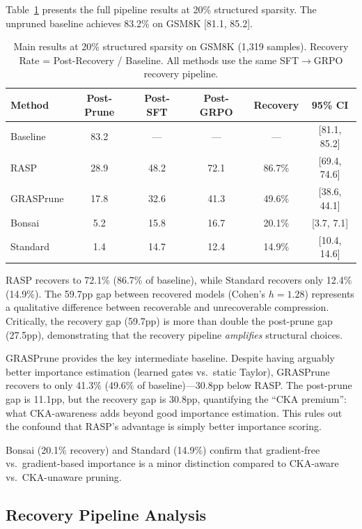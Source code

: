 \documentclass[11pt]{article}
\begin{document}
Table~\ref{tab:main} presents the full pipeline results at 20\% structured sparsity.
The unpruned baseline achieves 83.2\% on GSM8K [81.1, 85.2].

\begin{table}[t]
\centering
\caption{Main results at 20\% structured sparsity on GSM8K (1{,}319 samples). Recovery Rate = Post-Recovery / Baseline. All methods use the same SFT$\to$GRPO recovery pipeline.}
\label{tab:main}
\begin{tabular}{lccccc}
\toprule
\textbf{Method} & \textbf{Post-Prune} & \textbf{Post-SFT} & \textbf{Post-GRPO} & \textbf{Recovery} & \textbf{95\% CI} \\
\midrule
Baseline & 83.2 & --- & --- & --- & {[81.1, 85.2]} \\
RASP     & 28.9 & 48.2 & 72.1 & 86.7\% & {[69.4, 74.6]} \\
GRASPrune & 17.8 & 32.6 & 41.3 & 49.6\% & {[38.6, 44.1]} \\
Bonsai   & 5.2  & 15.8 & 16.7 & 20.1\% & {[3.7, 7.1]} \\
Standard & 1.4  & 14.7 & 12.4 & 14.9\% & {[10.4, 14.6]} \\
\bottomrule
\end{tabular}
\end{table}

RASP recovers to 72.1\% (86.7\% of baseline), while Standard recovers only 12.4\% (14.9\%).
The 59.7pp gap between recovered models (Cohen's $h = 1.28$) represents a qualitative difference between recoverable and unrecoverable compression.
Critically, the recovery gap (59.7pp) is more than double the post-prune gap (27.5pp), demonstrating that the recovery pipeline \emph{amplifies} structural choices.

GRASPrune provides the key intermediate baseline.
Despite having arguably better importance estimation (learned gates vs.\ static Taylor), GRASPrune recovers to only 41.3\% (49.6\% of baseline)---30.8pp below RASP.
The post-prune gap is 11.1pp, but the recovery gap is 30.8pp, quantifying the ``CKA premium'': what CKA-awareness adds beyond good importance estimation.
This rules out the confound that RASP's advantage is simply better importance scoring.

Bonsai (20.1\% recovery) and Standard (14.9\%) confirm that gradient-free vs.\ gradient-based importance is a minor distinction compared to CKA-aware vs.\ CKA-unaware pruning.


\subsection{Recovery Pipeline Analysis}
\label{sec:pipeline}
\end{document}
